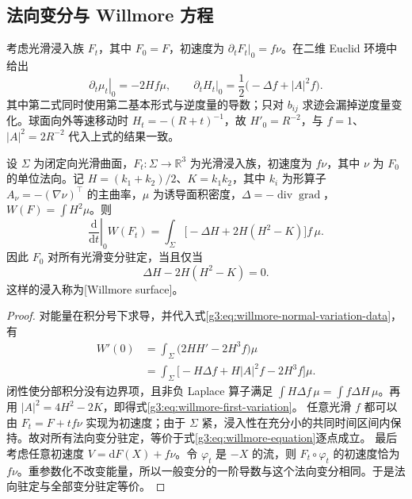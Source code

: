 \subsection{法向变分与 Willmore 方程}
\label{g3:subsec:1906:02}
考虑光滑浸入族 \(F_t\)，其中 \(F_0=F\)，初速度为 \(\partial_tF_t|_0=f\nu\)。在二维 Euclid 环境中给出
\begin{equation}\label{g3:eq:willmore-normal-variation-data}
	\left.\partial_t\mu_t\right|_0=-2Hf\mu,
	\qquad
	\left.\partial_tH_t\right|_0=\frac12\bigl(-\Delta f+|A|^2f\bigr).
\end{equation}
其中第二式同时使用第二基本形式与逆度量的导数；只对 \(b_{ij}\) 求迹会漏掉逆度量变化。球面向外等速移动时 \(H_t=-(R+t)^{-1}\)，故 \(H'_0=R^{-2}\)，与 \(f=1\)、\(|A|^2=2R^{-2}\) 代入上式的结果一致。

\begin{theorem}\label{g3:thm:willmore-first-variation}
	设 \(\Sigma\) 为闭定向光滑曲面，\(F_t:\Sigma\to\mathbb R^3\) 为光滑浸入族，初速度为 \(f\nu\)，其中 \(\nu\) 为 \(F_0\) 的单位法向。记 \(H=(k_1+k_2)/2\)、\(K=k_1k_2\)，其中 \(k_i\) 为形算子 \(A_\nu=-(\nabla\nu)^\top\) 的主曲率，\(\mu\) 为诱导面积密度，\(\Delta=-\operatorname{div}\operatorname{grad}\)，\(W(F)=\int H^2\mu\)。则
	\begin{equation}\label{g3:eq:willmore-first-variation}
		\left.\frac{\mathrm d}{\mathrm dt}\right|_0W(F_t)
		=\int_\Sigma\bigl[-\Delta H+2H(H^2-K)\bigr]f\,\mu.
	\end{equation}
	因此 \(F_0\) 对所有光滑变分驻定，当且仅当
	\begin{equation}\label{g3:eq:willmore-equation}
		\Delta H-2H(H^2-K)=0.
	\end{equation}
	这样的浸入称为[Willmore surface]。
\end{theorem}
\begin{proof}
	对能量在积分号下求导，并代入式\eqref{g3:eq:willmore-normal-variation-data}，有
	\[
		\begin{aligned}
		W'(0)
		&=\int_\Sigma\bigl(2HH'-2H^3f\bigr)\mu\\
		&=\int_\Sigma\bigl[-H\Delta f+H|A|^2f-2H^3f\bigr]\mu.
		\end{aligned}
	\]
	闭性使分部积分没有边界项，且非负 Laplace 算子满足 \(\int H\Delta f\,\mu=\int f\Delta H\,\mu\)。再用 \(|A|^2=4H^2-2K\)，即得式\eqref{g3:eq:willmore-first-variation}。
	任意光滑 \(f\) 都可以由 \(F_t=F+tf\nu\) 实现为初速度；由于 \(\Sigma\) 紧，浸入性在充分小的共同时间区间内保持。故对所有法向变分驻定，等价于式\eqref{g3:eq:willmore-equation}逐点成立。
	最后考虑任意初速度 \(V=\mathrm dF(X)+f\nu\)。令 \(\varphi_t\) 是 \(-X\) 的流，则 \(F_t\circ\varphi_t\) 的初速度恰为 \(f\nu\)。重参数化不改变能量，所以一般变分的一阶导数与这个法向变分相同。于是法向驻定与全部变分驻定等价。
\end{proof}

